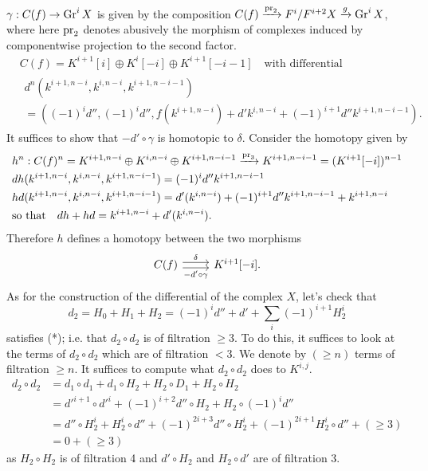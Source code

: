 \documentclass[deligne.tex]{subfiles}
\begin{document}
$\gamma:C(f)\rightarrow\operatorname{Gr}^iX$ is given by the composition
$C(f)\xrightarrow{\operatorname{pr}_2}F^i/F^{i+2}X\xrightarrow g\operatorname{Gr}^iX$, where here $\operatorname{pr}_2$ denotes
abusively the morphism of complexes induced by componentwise projection 
to the second factor.
\begin{align*}
	&C(f)=K^{i+1}[i]\oplus K^i[-i]\oplus K^{i+1}[-i-1]
	\quad\text{with differential} \\
	&\begin{multlined}d^n(k^{i+1,n-i},k^{i,n-i},k^{i+1,n-i-1}) \\
	=((-1)^id'',(-1)^id'',f(k^{i+1,n-i})+d'k^{i,n-i}+(-1)^{i+1}d''k^{i+1,n-i-1}).\end{multlined}
\end{align*}
It suffices to show that $-d'\circ\gamma$ is homotopic to $\delta$.
Consider the homotopy given by
\begin{align*}
	&h^n:C(f)^n=K^{i+1,n-i}\oplus K^{i,n-i}\oplus K^{i+1,n-i-1}
	\xrightarrow{\operatorname{pr}_3} K^{i+1,n-i-1}=(K^{i+1}[-i])^{n-1} \\
	&dh(k^{i+1,n-i},k^{i,n-i},k^{i+1,n-i-1})
	=(-1)^id''k^{i+1,n-i-1} \\
	&hd(k^{i+1,n-i},k^{i,n-i},k^{i+1,n-i-1})
	=d'(k^{i,n-i})+(-1)^{i+1}d''k^{i+1,n-i-1}+k^{i+1,n-i} \\
	&\text{so that}\quad
	dh+hd=k^{i+1,n-i}+d'(k^{i,n-i}).
\end{align*}
Therefore $h$ defines a homotopy between the two morphisms
\begin{equation*}\begin{tikzcd}
	C(f)\arrow[r,shift left,"\delta"]\arrow[r,shift right,"-d'\circ\gamma"']
	&K^{i+1}[-i].
\end{tikzcd}\end{equation*}
As for the construction of the differential of the complex $X$, let's
check that
\begin{equation*}
	d_2=H_0+H_1+H_2=(-1)^id''+d'+\sum_i(-1)^{i+1}H_2^i
\end{equation*}
satisfies (*); i.e. that $d_2\circ d_2$ is of filtration $\geq3$.
To do this, it suffices to look at the terms of $d_2\circ d_2$ which are
of filtration $<3$. We denote by $(\geq n)$ terms of filtration $\geq n$.
It suffices to compute what $d_2\circ d_2$ does to $K^{i,j}$.
\begin{align*}
	d_2\circ d_2
	&=d_1\circ d_1+d_1\circ H_2+H_2\circ D_1+H_2\circ H_2 \\
	&=d'^{i+1}\circ d'^i+(-1)^{i+2}d''\circ H_2+H_2\circ(-1)^id'' \\
	&=d''\circ H_2^i+H_2^i\circ d''+(-1)^{2i+3}d''\circ H_2^i+(-1)^{2i+1}H_2^i\circ d''+(\geq3) \\
	&=0+(\geq3)
\end{align*}
as $H_2\circ H_2$ is of filtration 4 and $d'\circ H_2$ and
$H_2\circ d'$ are of filtration 3.
\end{document}
